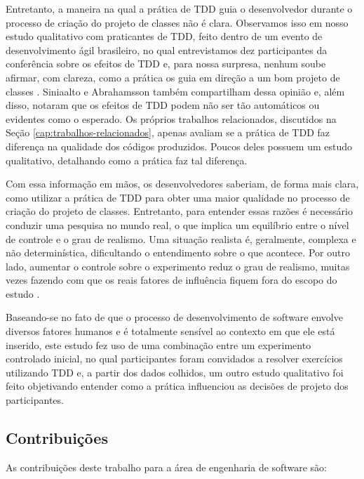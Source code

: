 \documentclass[conference]{IEEEtran}
\begin{document}
Entretanto, a maneira na qual a prática de TDD guia o desenvolvedor
durante o processo de criação do projeto de classes não é clara. Observamos
isso em nosso estudo qualitativo com praticantes de TDD, feito dentro de um
evento de desenvolvimento ágil brasileiro, no qual entrevistamos dez
participantes da conferência sobre os efeitos de TDD e, para nossa surpresa,
nenhum soube afirmar, com clareza, como a prática os guia em direção
a um bom projeto de classes \cite{aniche-wbma}.
Siniaalto e Abrahamsson \cite{alarming-results} também
compartilham dessa opinião e, além disso, notaram que os efeitos de TDD podem 
não ser tão automáticos ou evidentes como o esperado.
Os próprios trabalhos relacionados, discutidos na Seção \ref{cap:trabalhos-relacionados},
apenas avaliam se a prática de TDD faz diferença na qualidade dos códigos produzidos.
Poucos deles possuem um estudo qualitativo, detalhando como a prática
faz tal diferença.

Com essa informação em mãos, os desenvolvedores saberiam, de forma mais clara,
como utilizar a prática de TDD para obter uma maior qualidade no processo de criação
do projeto de classes. Entretanto, para entender essas razões é necessário
conduzir uma pesquisa no mundo real, o que  
implica um equilíbrio entre o nível de controle
e o grau de realismo. Uma situação realista é, geralmente, complexa e 
não determinística, dificultando o entendimento sobre o que acontece. Por outro
lado, aumentar o controle sobre o experimento reduz o grau de realismo, muitas
vezes fazendo com que os reais fatores de influência fiquem fora do escopo do 
estudo \cite{guidelines-case-study}.

Baseando-se no fato de que o processo de desenvolvimento de software envolve 
diversos fatores humanos e é totalmente sensível ao contexto em que ele está 
inserido, 
este estudo fez uso de uma combinação entre um experimento controlado inicial, 
no qual participantes foram convidados a resolver exercícios utilizando TDD e, 
a partir dos dados colhidos, um outro estudo qualitativo foi 
feito objetivando entender como a prática influenciou as decisões de projeto 
dos participantes.

\subsection{Contribuições}

As contribuições deste trabalho para a área de engenharia de software
são:
\end{document}
